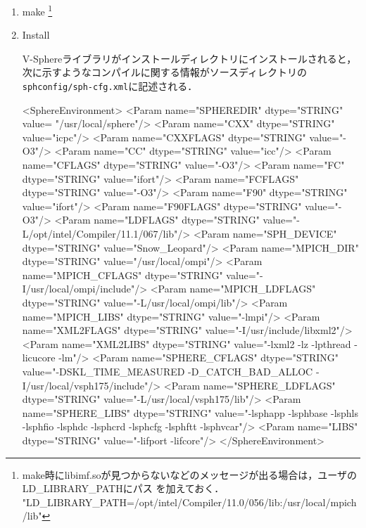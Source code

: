 \begin{enumerate}
{
}


\item make
\footnote{make時にlibimf.soが見つからないなどのメッセージが出る場合は，ユーザのLD\_LIBRARY\_PATHにパス を加えておく．\\
"LD\_LIBRARY\_PATH=/opt/intel/Compiler/11.0/056/lib:/usr/local/mpich/lib"}

{\small
\begin{program}
$ make
\end{program}
}
\vspace{\baselineskip}

\item Install
{\small
\begin{program}
$ sudo make install　または　make install
\end{program}
}

V-Sphereライブラリがインストールディレクトリにインストールされると，次に示すようなコンパイルに関する情報がソースディレクトリの\verb|sphconfig/sph-cfg.xml|に記述される．
{\small
\begin{program}
<SphereEnvironment>
  <Param name="SPHEREDIR" dtype="STRING" value= "/usr/local/sphere"/>
  <Param name="CXX" dtype="STRING" value="icpc"/>
  <Param name="CXXFLAGS" dtype="STRING" value="-O3"/>
  <Param name="CC" dtype="STRING" value="icc"/>
  <Param name="CFLAGS" dtype="STRING" value="-O3"/>
  <Param name="FC" dtype="STRING" value="ifort"/>
  <Param name="FCFLAGS" dtype="STRING" value="-O3"/>
  <Param name="F90" dtype="STRING" value="ifort"/>
  <Param name="F90FLAGS" dtype="STRING" value="-O3"/>
  <Param name="LDFLAGS" dtype="STRING" value="-L/opt/intel/Compiler/11.1/067/lib"/>
  <Param name="SPH_DEVICE" dtype="STRING" value="Snow_Leopard"/>
  <Param name="MPICH_DIR" dtype="STRING" value="/usr/local/ompi"/>
  <Param name="MPICH_CFLAGS" dtype="STRING" value="-I/usr/local/ompi/include"/>
  <Param name="MPICH_LDFLAGS" dtype="STRING" value="-L/usr/local/ompi/lib"/>
  <Param name="MPICH_LIBS" dtype="STRING" value="-lmpi"/>
  <Param name="XML2FLAGS" dtype="STRING" value="-I/usr/include/libxml2"/>
  <Param name="XML2LIBS" dtype="STRING" value="-lxml2 -lz -lpthread -licucore -lm"/>
  <Param name="SPHERE_CFLAGS" dtype="STRING" value="-DSKL_TIME_MEASURED -D_CATCH_BAD_ALLOC 
               -I/usr/local/vsph175/include"/>
  <Param name="SPHERE_LDFLAGS" dtype="STRING" value="-L/usr/local/vsph175/lib"/>
  <Param name="SPHERE_LIBS" dtype="STRING" value="-lsphapp -lsphbase -lsphls -lsphfio -lsphdc 
               -lsphcrd -lsphcfg -lsphftt -lsphvcar"/>
  <Param name="LIBS" dtype="STRING" value="-lifport -lifcore"/>
</SphereEnvironment>
\end{program} 
}


\end{enumerate}
